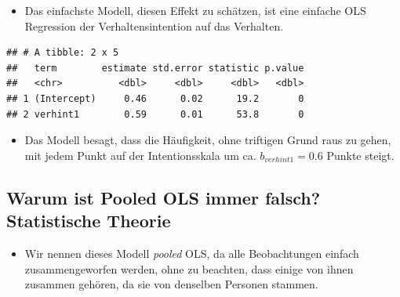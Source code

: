 \documentclass[]{book}
\newenvironment{Shaded}{\begin{snugshade}}{\end{snugshade}}
\newcommand{\DataTypeTok}[1]{\textcolor[rgb]{0.13,0.29,0.53}{#1}}
\newcommand{\DecValTok}[1]{\textcolor[rgb]{0.00,0.00,0.81}{#1}}
\newcommand{\KeywordTok}[1]{\textcolor[rgb]{0.13,0.29,0.53}{\textbf{#1}}}
\newcommand{\NormalTok}[1]{#1}
\newcommand{\OperatorTok}[1]{\textcolor[rgb]{0.81,0.36,0.00}{\textbf{#1}}}
\newcommand{\StringTok}[1]{\textcolor[rgb]{0.31,0.60,0.02}{#1}}
\providecommand{\tightlist}{%
  \setlength{\itemsep}{0pt}\setlength{\parskip}{0pt}}
\begin{document}
\begin{itemize}
\tightlist
\item
  Das einfachste Modell, diesen Effekt zu schätzen, ist eine einfache OLS Regression der Verhaltensintention auf das Verhalten.
\end{itemize}

\begin{Shaded}
\end{Shaded}

\begin{verbatim}
## # A tibble: 2 x 5
##   term        estimate std.error statistic p.value
##   <chr>          <dbl>     <dbl>     <dbl>   <dbl>
## 1 (Intercept)     0.46      0.02      19.2       0
## 2 verhint1        0.59      0.01      53.8       0
\end{verbatim}

\begin{itemize}
\tightlist
\item
  Das Modell besagt, dass die Häufigkeit, ohne triftigen Grund raus zu gehen, mit jedem Punkt auf der Intentionsskala um ca. \(b_{verhint1} = 0.6\) Punkte steigt.
\end{itemize}

\hypertarget{warum-ist-pooled-ols-immer-falsch-statistische-theorie}{%
\subsection*{Warum ist Pooled OLS immer falsch? Statistische Theorie}\label{warum-ist-pooled-ols-immer-falsch-statistische-theorie}}

\begin{itemize}
\tightlist
\item
  Wir nennen dieses Modell \emph{pooled} OLS, da alle Beobachtungen einfach zusammengeworfen werden, ohne zu beachten, dass einige von ihnen zusammen gehören, da sie von denselben Personen stammen.
\end{itemize}
\end{document}

